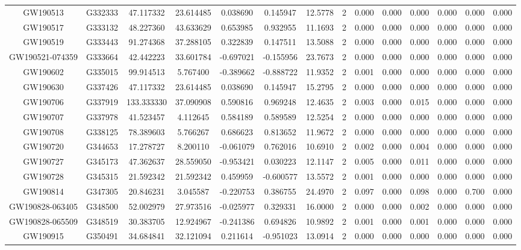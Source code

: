 \begin{table}[]
\begin{tabular}{cccccccccccccc}
GW190513 &	G332333 &	47.117332 &	23.614485 &	0.038690 &	0.145947 &	12.5778 &	2 & 0.000 &	0.000 &	0.000 &	0.000 & 0.000 & 0.000 \\
GW190517 &	G333132 &	48.227360 &	43.633629 &	0.653985 &	0.932955 &	11.1693 &	2 & 0.000 &	0.000 &	0.000 &	0.000 & 0.000 & 0.000 \\
GW190519 &	G333443 &	91.274368 &	37.288105 &	0.322839 &	0.147511 &	13.5088 &	2 & 0.000 &	0.000 &	0.000 &	0.000 & 0.000 & 0.000 \\
GW190521-074359 &	G333664 & 42.442223 &	33.601784 &	-0.697021 &	-0.155956 &	23.7673 &	2 & 0.000 &	0.000 &	0.000 &	0.000 & 0.000 & 0.000 \\
GW190602 &	G335015 & 99.914513 &	5.767400 &	-0.389662 &	-0.888722 &	11.9352 &	2 & 0.001 &	0.000 &	0.000 &	0.000 & 0.000 & 0.000 \\
GW190630 &	G337426 &	47.117332 &	23.614485  &	0.038690 &	0.145947 &	15.2795 &	2 & 0.000 &	0.000 	&	0.000 &	0.000 & 0.000 & 0.000 \\
GW190706 &	G337919 &	133.333330 &	37.090908 &	0.590816 &	0.969248 & 	12.4635 &	2 &	0.003 &	0.000 & 0.015 &	0.000 &	0.000 &	0.000 \\ 
GW190707 &	G337978 &	41.523457 &	4.112645 &	0.584189 &	0.589589 & 	12.5254 &	2 &	0.000 &	0.000 & 0.000 & 0.000 &	0.000 &	0.000 \\
GW190708 &	G338125 &	78.389603 &	5.766267 &	0.686623 &	0.813652 &	11.9672 &	2 &	0.000 &	0.000 & 0.000 &	0.000 &	0.000 &	0.000 \\
GW190720 &	G344653 &	17.278727 &	8.200110 &	-0.061079 &	0.762016 &	10.6910 &	2 &	0.002 &	0.000 & 0.004 &	0.000 &	0.000 &	0.000 \\
GW190727 &	G345173 &	47.362637 &	28.559050 &	-0.953421 &	0.030223 &	12.1147 &	2 &	0.005 &	0.000 & 0.011 &	0.000 &	0.000 &	0.000 \\
GW190728 &	G345315 &	21.592342 &	21.592342 &	0.459959 &	-0.600577 &	13.5572 &	2 &	0.001 &	0.000 & 0.000 &	0.000 &	0.000 &	0.000 \\
GW190814 &	G347305 &	20.846231 &	3.045587 &	-0.220753 &	0.386755 &	24.4970 & 	2 &	0.097 &	0.000 & 0.098 &	0.000 &	0.700 &	0.000 \\
GW190828-063405 &	G348500 &	52.002979 &	27.973516 &	-0.025977 &	0.329331 &	16.0000 &	2 &	0.000 &	0.000 & 0.002 &	0.000 &	0.000 & 0.000 \\
GW190828-065509 & 	G348519 &	30.383705 &	12.924967 &	-0.241386 &	0.694826 & 	10.9892 &	2 &	0.001 &	0.000 & 0.001 &	0.000 &	0.000 &	0.000 \\
GW190915 &	G350491 &	34.684841 &	32.121094 &	0.211614 &	-0.951023 &	13.0914 &	2 &	0.000 &	0.000 & 0.000 &	0.000 &	0.000 &	0.000 \\

\end{tabular}
\end{table}
